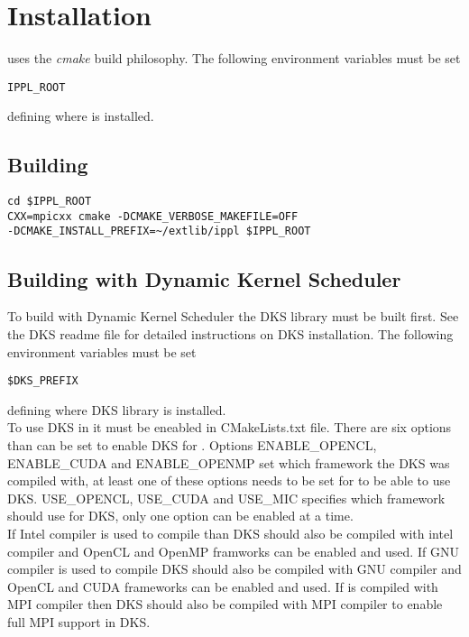 \section{Installation}
 \ippl uses the {\em cmake } build philosophy.  The following environment variables must be set
\begin{verbatim}
IPPL_ROOT
\end{verbatim} 
defining where \ippl is installed.

\subsection{Building \ippl}
\begin{verbatim}
cd $IPPL_ROOT
CXX=mpicxx cmake -DCMAKE_VERBOSE_MAKEFILE=OFF
-DCMAKE_INSTALL_PREFIX=~/extlib/ippl $IPPL_ROOT
\end{verbatim}


\subsection{Building \ippl with Dynamic Kernel Scheduler}
To build \ippl with Dynamic Kernel Scheduler the DKS library must be built first. See the DKS readme file
for detailed instructions on DKS installation. The following environment variables must be set
\begin{verbatim}
$DKS_PREFIX
\end{verbatim}
defining where DKS library is installed.\\
To use DKS in \ippl it must be eneabled in CMakeLists.txt file. There are six options than can be set to
enable DKS for \ippl. Options ENABLE\_OPENCL, ENABLE\_CUDA and ENABLE\_OPENMP set which framework the 
DKS  was compiled with, at least one of these options needs to be set for \ippl to be able 
to use DKS. USE\_OPENCL, USE\_CUDA and USE\_MIC specifies which framework \ippl should use for DKS, only one 
option can be enabled at a time.\\ 
If Intel compiler is used to compile \ippl than DKS should also be compiled 
with intel compiler and OpenCL and OpenMP framworks can be enabled and used. If GNU compiler is used to compile 
\ippl DKS should also be compiled with GNU compiler and OpenCL and CUDA frameworks can be enabled and used. 
If \ippl is compiled with MPI compiler then DKS should also be compiled with MPI compiler to enable full MPI 
support in DKS.


